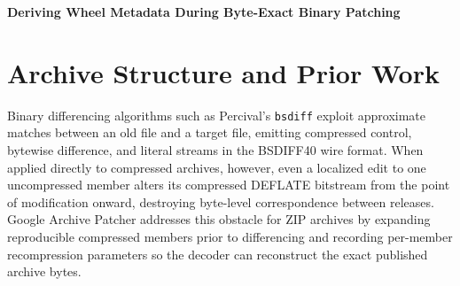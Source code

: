 \documentclass[10pt,letterpaper]{article}
\theoremstyle{remark}
\begin{document}
\begin{center}
{\Large\bfseries Deriving Wheel Metadata During Byte-Exact Binary Patching\par}
\end{center}
\vspace{0.5em}

\begin{abstract}
Package distribution pipelines frequently require reconstructing a published archive down to its final byte so that cryptographic signatures and repository checksums remain valid. In ZIP-based archives, small source edits perturb entire compressed DEFLATE bitstreams, and Python wheels introduce a second layer of cascading entropy because their \texttt{RECORD} metadata lists cryptographic SHA-256 digests of every modified member. We combine reproducible archive-member expansion with deferred, in-memory derivation of eligible \texttt{RECORD} digests during patch application, and we establish the span-preservation and byte-exactness invariants of the two-pass decoder. Across sixteen frozen PyPI wheel release pairs spanning platform-independent Python and Windows \texttt{amd64} native packages, complete self-contained patches total 431,406 bytes---a 51.43\% reduction from an 888,127-byte archive-aware baseline (and a 91.62\% reduction from 5,148,312 bytes of archive-unaware BSDIFF40 deltas). Deriving \texttt{RECORD} digests saves 9,720 bytes (2.20\%) beyond the preceding 441,126-byte best recipes and reduces patch size for every project in the cohort. A second encoding reproduces all sixteen winning patch SHA-256 digests identically, and every decoded wheel matches its published PyPI bytes exactly.
\end{abstract}

\section{Archive Structure and Prior Work}
\label{sec:prior}

Binary differencing algorithms such as Percival's \texttt{bsdiff} \cite{percival2003bsdiff} exploit approximate matches between an old file and a target file, emitting compressed control, bytewise difference, and literal streams in the BSDIFF40 wire format. When applied directly to compressed archives, however, even a localized edit to one uncompressed member alters its compressed DEFLATE bitstream \cite{rfc1951} from the point of modification onward, destroying byte-level correspondence between releases. Google Archive Patcher \cite{archivepatcher} addresses this obstacle for ZIP archives by expanding reproducible compressed members prior to differencing and recording per-member recompression parameters so the decoder can reconstruct the exact published archive bytes.
\end{document}
